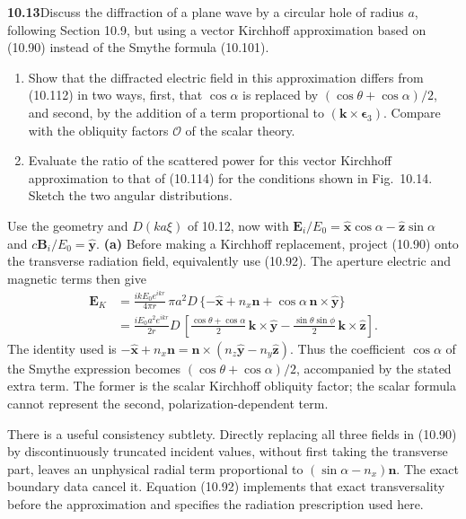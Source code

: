 \par\bigskip
\noindent\textbf{10.13}\quad Discuss the diffraction of a plane wave by a circular hole of radius $a$, following Section 10.9, but using a vector Kirchhoff approximation based on (10.90) instead of the Smythe formula (10.101).
\begin{enumerate}
\item[(a)] Show that the diffracted electric field in this approximation differs from (10.112) in two ways, first, that $\cos\alpha$ is replaced by $(\cos\theta+\cos\alpha)/2$, and second, by the addition of a term proportional to $(\mathbf{k}\times\boldsymbol{\epsilon}_{3})$. Compare with the obliquity factors $\mathcal{O}$ of the scalar theory.
\item[(b)] Evaluate the ratio of the scattered power for this vector Kirchhoff approximation to that of (10.114) for the conditions shown in Fig.~10.14. Sketch the two angular distributions.
\end{enumerate}
\solution
Use the geometry and $D(ka\xi)$ of 10.12, now with
$\mathbf E_i/E_0=\widehat{\mathbf x}\cos\alpha-
\widehat{\mathbf z}\sin\alpha$ and $c\mathbf B_i/E_0=\widehat{\mathbf y}$.
\textbf{(a)} Before making a Kirchhoff replacement, project (10.90)
onto the transverse radiation field, equivalently use (10.92).
The aperture electric and magnetic terms then give
\[
\begin{split}
\mathbf E_K
&=\frac{ikE_0e^{ikr}}{4\pi r}\,\pi a^2D\,
\{-\widehat{\mathbf x}+n_x\mathbf n+
\cos\alpha\,\mathbf n\times\widehat{\mathbf y}\}\\
&=\boxed{\frac{iE_0a^2e^{ikr}}{2r}D\,
\left[\frac{\cos\theta+\cos\alpha}{2}
\,\mathbf k\times\widehat{\mathbf y}
-\frac{\sin\theta\sin\phi}{2}
\,\mathbf k\times\widehat{\mathbf z}\right].}
\end{split}
\]
The identity used is
$-\widehat{\mathbf x}+n_x\mathbf n
=\mathbf n\times(n_z\widehat{\mathbf y}-n_y\widehat{\mathbf z})$.
Thus the coefficient $\cos\alpha$ of the Smythe expression becomes
$(\cos\theta+\cos\alpha)/2$, accompanied by the stated extra term.
The former is the scalar Kirchhoff obliquity factor; the scalar formula
cannot represent the second, polarization-dependent term.

There is a useful consistency subtlety. Directly replacing all three
fields in (10.90) by discontinuously truncated incident values, without
first taking the transverse part, leaves an unphysical radial term
proportional to $(\sin\alpha-n_x)\mathbf n$. The exact boundary data
cancel it. Equation (10.92) implements that exact transversality before
the approximation and specifies the radiation prescription used here.

